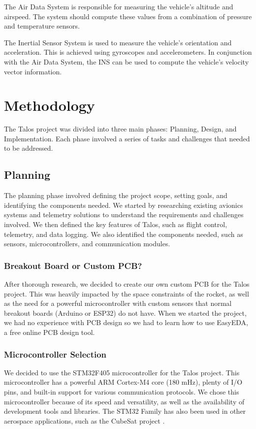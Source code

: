 \documentclass{article}
\begin{document}
The Air Data System is responsible for measuring the vehicle's altitude and airspeed. The system should compute these values from a combination of pressure and temperature sensors.

The Inertial Sensor System is used to measure the vehicle's orientation and acceleration. This is achieved using gyroscopes and accelerometers. In conjunction with the Air Data System, the INS can be used to compute the vehicle's velocity vector information.

\section{Methodology}

The Talos project was divided into three main phases: Planning, Design, and Implementation. Each phase involved a series of tasks and challenges that needed to be addressed.

\subsection{Planning}

The planning phase involved defining the project scope, setting goals, and identifying the components needed. We started by researching existing avionics systems and telemetry solutions to understand the requirements and challenges involved. We then defined the key features of Talos, such as flight control, telemetry, and data logging. We also identified the components needed, such as sensors, microcontrollers, and communication modules.
\subsubsection{Breakout Board or Custom PCB?}
After thorough research, we decided to create our own custom PCB for the Talos project. This was heavily impacted by the space constraints of the rocket, as well as the need for a powerful microcontroller with custom sensors that normal breakout boards (Arduino or ESP32) do not have. When we started the project, we had no experience with PCB design so we had to learn how to use EasyEDA, a free online PCB design tool.
\subsubsection{Microcontroller Selection}
We decided to use the STM32F405 microcontroller for the Talos project. This microcontroller has a powerful ARM Cortex-M4 core (180 mHz), plenty of I/O pins, and built-in support for various communication protocols. We chose this microcontroller because of its speed and versatility, as well as the availability of development tools and libraries. The STM32 Family has also been used in other aerospace applications, such as the CubeSat project \cite{Yost_2023}.

\printbibliography
\end{document}
